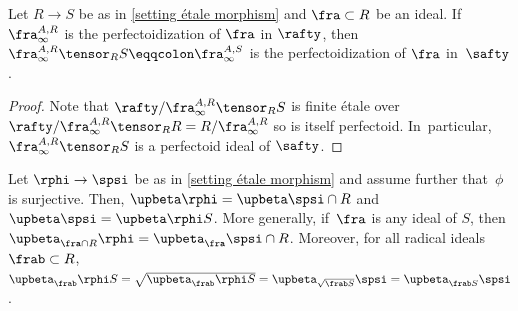 \begin{lemma}\label{lemma extension of perfectoid ideal étale case}
Let $R\to S$ be as in \autoref{setting étale morphism} and $\fra\subset R$ be an ideal. If~$\fra^{A,R}_\infty$ is the perfectoidization of $\fra$ in $\rafty$, then $\fra^{A,R}_\infty\tensor_R S\eqqcolon\fra^{A,S}_\infty$ is the perfectoidization of $\fra$ in~$\safty$.
\end{lemma}

\begin{proof}
Note that $\rafty/\fra^{A,R}_\infty\tensor_R S$ is finite étale over $\rafty/\fra^{A,R}_\infty\tensor_R R= R/\fra^{A,R}_\infty$ so is itself perfectoid. In~particular, $\fra^{A,R}_\infty\tensor_R S$ is a perfectoid ideal of $\safty$.
\end{proof}

\begin{proposition}\label{behavior beta étale morphism}
Let $\rphi\to\spsi$ be as in \autoref{setting étale morphism} and assume further that~$\phi$ is surjective. Then, $\upbeta\rphi=\upbeta\spsi\cap R$ and $\upbeta\spsi=\upbeta\rphi S$. More generally, if~$\fra$ is any ideal of $S$, then $\upbeta_{\fra\cap R} \rphi=\upbeta_\fra \spsi \cap R$.
Moreover, for all radical ideals $\frab\subset R$, $\upbeta_\frab\rphi S=\sqrt{\upbeta_\frab\rphi S}=\upbeta_{\sqrt{\frab S}}\spsi=\upbeta_{\frab S}\spsi$.
\end{proposition}

